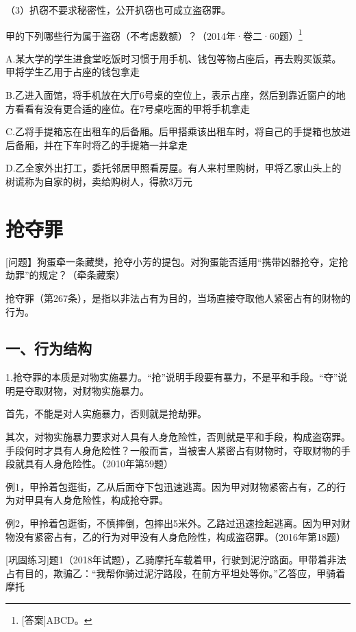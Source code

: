（3）扒窃不要求秘密性，公开扒窃也可成立盗窃罪。


甲的下列哪些行为属于盗窃（不考虑数额）？（2014年·卷二·60题）\footnote{[答案]ABCD。}

A.某大学的学生进食堂吃饭时习惯于用手机、钱包等物占座后，再去购买饭菜。甲将学生乙用于占座的钱包拿走

B.乙进入面馆，将手机放在大厅6号桌的空位上，表示占座，然后到靠近窗户的地方看看有没有更合适的座位。在7号桌吃面的甲将手机拿走

C.乙将手提箱忘在出租车的后备厢。后甲搭乘该出租车时，将自己的手提箱也放进后备厢，并在下车时将乙的手提箱一并拿走

D.乙全家外出打工，委托邻居甲照看房屋。有人来村里购树，甲将乙家山头上的树谎称为自家的树，卖给购树人，得款3万元

\section{抢夺罪}

[问题】狗蛋牵一条藏樊，抢夺小芳的提包。对狗蛋能否适用“携带凶器抢夺，定抢劫罪”的规定？（牵条藏案）

抢夺罪（第267条），是指以非法占有为目的，当场直接夺取他人紧密占有的财物的行为。

\subsection*{一、行为结构}


1.抢夺罪的本质是对物实施暴力。“抢”说明手段要有暴力，不是平和手段。“夺”说明是夺取财物，对财物实施暴力。

首先，不能是对人实施暴力，否则就是抢劫罪。

其次，对物实施暴力要求对人具有人身危险性，否则就是平和手段，构成盗窃罪。手段何时才具有人身危险性？一般而言，当被害人紧密占有财物时，夺取财物的手段就具有人身危险性。（2010年第59题）

例1，甲拎着包逛街，乙从后面夺下包迅速逃离。因为甲对财物紧密占有，乙的行为对甲具有人身危险性，构成抢夺罪。

例2，甲拎着包逛街，不慎摔倒，包摔出5米外。乙路过迅速捡起逃离。因为甲对财物没有紧密占有，乙的行为对甲没有人身危险性，构成盗窃罪。（2016年第18题）

[巩固练习]题1（2018年试题），乙骑摩托车载着甲，行驶到泥泞路面。甲带着非法占有目的，欺骗乙：“我帮你骑过泥泞路段，在前方平坦处等你。”乙答应，甲骑着摩托

